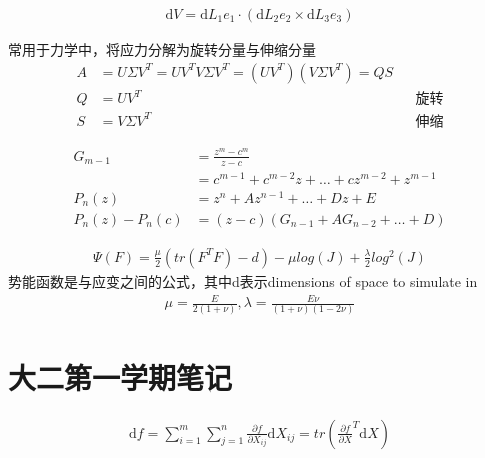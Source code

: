 \begin{thm}[给定三个向量形成三维图形的体积]
		\begin{align*}
				\mathrm{d}V = \mathrm{d}L_1e_1\cdot (\mathrm{d}L_2e_2\times \mathrm{d}L_3e_3)  
		\end{align*}
\end{thm}
\begin{thm}[极分解]
常用于力学中，将应力分解为旋转分量与伸缩分量
\begin{align*}
		A &= U \Sigma V^T = UV^TV\Sigma V^T = (UV^T)(V\Sigma V^T) = QS\\
		Q &= UV^T  &&\text{旋转} \\
		S &= V\Sigma V^T &&\text{伸缩} 
\end{align*}
\end{thm}

\begin{thm}[代数基本定理的证明]
		\begin{align*}
				G_{m-1}&= \frac{z^m - c^m}{z-c} \\
					   &=c^{m-1}+c^{m-2}z+\ldots+cz^{m-2}+z^{m-1}  \\
				P_n(z) &= z^n + Az^{n-1} + \ldots+Dz + E\\
				P_n(z) - P_n(c) &= (z-c)(G_{n-1}+AG_{n-2}+\ldots+D)
		\end{align*}
\end{thm}
\begin{thm}
		\begin{align*}
		\Psi(F) = \frac{\mu}{2} (tr(F^TF)-d)  - \mu log(J) + \frac{\lambda}{2}  log^2(J)
		\end{align*}
		势能函数是与应变之间的公式，其中d表示dimensions of space to simulate in 
\begin{align*}
		\mu  = \frac{E}{2(1+\nu )} , \lambda = \frac{E\nu }{(1+\nu )(1-2\nu )} 
\end{align*}
\end{thm}
\section{大二第一学期笔记}
\begin{thm}[矩阵内积以表示矩阵微分]
		\begin{align*}
				\mathrm{d}f = \sum_{i=1}^{m} \sum_{j=1}^{n} \frac{\partial f}{\partial X_{ij}} \mathrm{d}X_{ij}=tr(\frac{\partial f}{\partial X} ^T \mathrm{d}X)
		\end{align*}
\end{thm}
\ifx\allfiles\undefined

\fi

